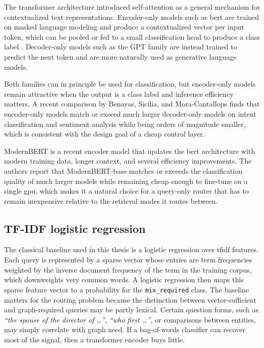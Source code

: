 \documentclass[english, bibtex]{kththesis}               %
\numberwithin{listing}{chapter}
\begin{document}
The transformer architecture \cite{devlin2019bert} introduced self-attention as a general mechanism for contextualized text representations. Encoder-only models such as \gls{bert} are trained on masked language modeling and produce a contextualized vector per input token, which can be pooled or fed to a small classification head to produce a class label \cite{devlin2019bert}. Decoder-only models such as the GPT family are instead trained to predict the next token and are more naturally used as generative language models.

Both families can in principle be used for classification, but encoder-only models remain attractive when the output is a class label and inference efficiency matters. A recent comparison by Benayas, Sicilia, and Mora-Cantallops \cite{benayas2024encoder} finds that encoder-only models match or exceed much larger decoder-only models on intent classification and sentiment analysis while being orders of magnitude smaller, which is consistent with the design goal of a cheap control layer.

ModernBERT \cite{warner2024modernbert} is a recent encoder model that updates the \gls{bert} architecture with modern training data, longer context, and several efficiency improvements. The authors report that ModernBERT-base matches or exceeds the classification quality of much larger models while remaining cheap enough to fine-tune on a single \gls{gpu}, which makes it a natural choice for a query-only router that has to remain inexpensive relative to the retrieval modes it routes between.

\subsection{TF-IDF logistic regression}
\label{sec:backgroundTfidf}

The classical baseline used in this thesis is a logistic regression over \gls{tfidf} features. Each query is represented by a sparse vector whose entries are term frequencies weighted by the inverse document frequency of the term in the training corpus, which downweights very common words. A logistic regression then maps this sparse feature vector to a probability for the \texttt{mix\_required} class. The baseline matters for the routing problem because the distinction between vector-sufficient and graph-required queries may be partly lexical. Certain question forms, such as \emph{``the spouse of the director of \ldots''}, \emph{``who first \ldots''}, or comparisons between entities, may simply correlate with graph need. If a bag-of-words classifier can recover most of the signal, then a transformer encoder buys little.
\end{document}
